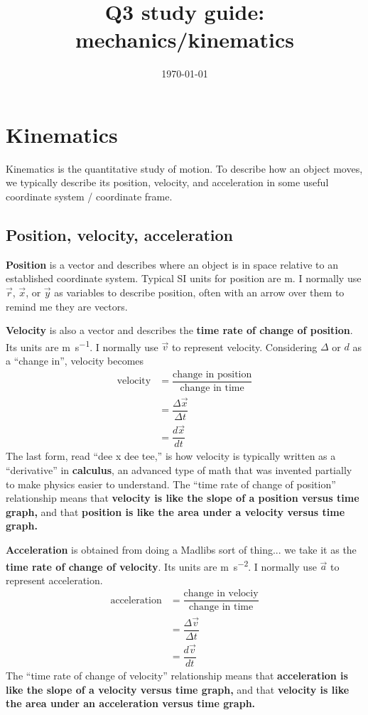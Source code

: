\documentclass[handout]{tufte-handout}
\title{Q3 study guide: mechanics/kinematics}
\date{\today}
\author{\mobeardInstructorShort}
\begin{document}
\maketitle
\section{Kinematics}
Kinematics is the quantitative study of motion. To describe how an object moves, we typically describe its position, velocity, and acceleration in some useful coordinate system / coordinate frame. 
\subsection{Position, velocity, acceleration}
\textbf{Position} is a vector and describes where an object is in space relative to an established coordinate system. Typical SI units for position are \si{\meter}. I normally use $\vec{r}$, $\vec{x}$, or $\vec{y}$ as variables to describe position, often with an arrow over them to remind me they are vectors. 

\textbf{Velocity} is also a vector and describes the \textbf{time rate of change of position}. Its units are \si{\meter\per\second}. I normally use $\vec{v}$ to represent velocity. Considering $\Delta$ or $d$ as a ``change in'', velocity becomes
\begin{align}
\text{velocity} &= \dfrac{\text{change in position}}{\text{change in time}} \\
&= \dfrac{\Delta \vec{x}}{\Delta t} \\
&= \dfrac{d\vec{x}}{dt}
\end{align}
The last form, read ``dee x dee tee,'' is how velocity is typically written as a ``derivative'' in \textbf{calculus}, an advanced type of math that was invented partially to make physics easier to understand. The ``time rate of change of position'' relationship means that \textbf{velocity is like the slope of a position versus time graph,} and that \textbf{position is like the area under a velocity versus time graph.} 

\textbf{Acceleration} is obtained from doing a Madlibs sort of thing... we take it as the \textbf{time rate of change of velocity}. Its units are \si{\meter\per\second\squared}. I normally use $\vec{a}$ to represent acceleration. 
\begin{align}
\text{acceleration} &= \dfrac{\text{change in velociy}}{\text{change in time}} \\
&= \dfrac{\Delta \vec{v}}{\Delta t} \\
&= \dfrac{d \vec{v}}{dt}
\end{align}
The ``time rate of change of velocity'' relationship means that \textbf{acceleration is like the slope of a velocity versus time graph,} and that \textbf{velocity is like the area under an acceleration versus time graph.} 
\end{document}
